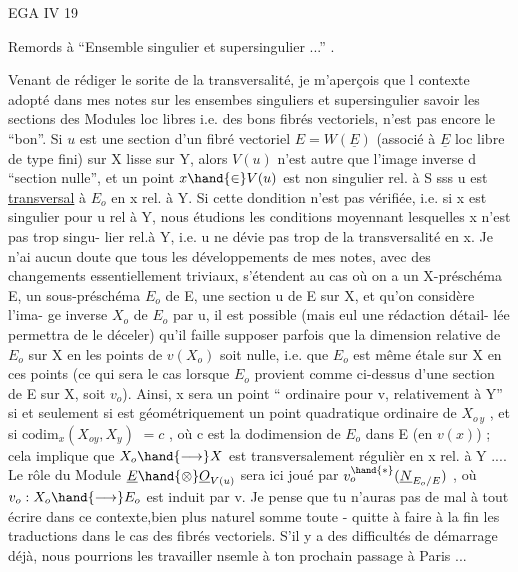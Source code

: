 
EGA IV 19

Remords à ``Ensemble singulier et supersingulier ...'' .

Venant de rédiger le sorite de la transversalité, je m'aperçois que l
contexte adopté dans mes notes sur les ensembes singuliers et supersingulier
savoir les sections des Modules loc libres i.e. des bons fibrés vectoriels,
n'est pas encore le ``bon''. Si $u$ est une section d'un fibré vectoriel
$E = W(\underline{E})$ (associé à $\underline{E}$ loc libre de type fini) sur X lisse sur Y, alors $V(u)$
n'est autre que l'image inverse d   ``section nulle'', et un point $x\hand{\in} V(u)$
est non singulier  rel. à S sss u est \uline{transversal} à $E_{o}$ en x rel. à Y.
Si cette dondition n'est pas vérifiée, i.e. si x est singulier pour u rel à
Y, nous étudions les conditions moyennant lesquelles x n'est pas trop singu-%
lier rel.à Y, i.e. u ne dévie pas trop de la transversalité en x. Je n'ai
aucun doute que tous les développements de mes notes, avec des changements
essentiellement triviaux, s'étendent au cas où on a un X-préschéma E, un
sous-préschéma $E_{o}$ de E, une section  u de E sur X, et qu'on considère l'ima-%
ge inverse $X_{o}$ de $E_{o}$ par u,  il est possible (mais eul une rédaction détail-%
lée permettra de le déceler) qu'il faille supposer parfois que la dimension
relative de $E_{o}$ sur X en les points de $v(X_{o})$ soit nulle, i.e. que $E_{o}$ est
même étale sur X en ces points (ce qui sera le cas lorsque $E_{o}$ provient comme
ci-dessus d'une section de E sur X, soit $v_{o}$). Ainsi, x sera un point
``  ordinaire pour v, relativement à Y'' si et seulement si    est
géométriquement un point quadratique ordinaire de $X_{o\,y}$ , et si $\mathrm{codim}_{x}(X_{oy},X_{y})$
$= c$ , où c est la dodimension de $E_{o}$ dans E (en $v(x)$) ; cela implique que
$X_{o}\hand{\longrightarrow} X$ est  transversalement régulièr en x rel. à Y .... Le rôle du Module
$\underline{E}\hand{\otimes}\underline{O}_{V(u)}$ sera ici joué par $v_{o}^{\hand{*}}(\underline{N}_{E_{o}/E})$ , où $v_{o}:X_{o}\hand{\longrightarrow} E_{o}$ est induit par v. Je
pense que tu n'auras pas de mal à tout écrire dans ce contexte,bien plus
naturel somme toute - quitte à faire à la fin les traductions dans le cas
des fibrés vectoriels. S'il y a des difficultés de démarrage déjà, nous
pourrions les travailler nsemle à ton prochain passage à Paris ... 

